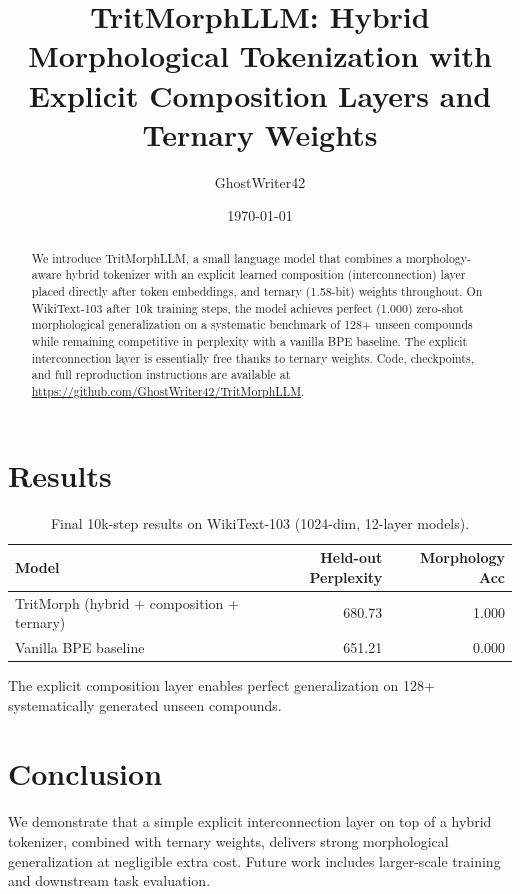 \documentclass[11pt,a4paper]{article}
\title{TritMorphLLM: Hybrid Morphological Tokenization with Explicit Composition Layers and Ternary Weights}
\author{GhostWriter42}
\date{\today}
\begin{document}
\maketitle

\begin{abstract}
We introduce TritMorphLLM, a small language model that combines a morphology-aware hybrid tokenizer with an explicit learned composition (interconnection) layer placed directly after token embeddings, and ternary (1.58-bit) weights throughout. On WikiText-103 after 10k training steps, the model achieves perfect (1.000) zero-shot morphological generalization on a systematic benchmark of 128+ unseen compounds while remaining competitive in perplexity with a vanilla BPE baseline. The explicit interconnection layer is essentially free thanks to ternary weights. Code, checkpoints, and full reproduction instructions are available at \url{https://github.com/GhostWriter42/TritMorphLLM}.
\end{abstract}

\section{Results}

\begin{table}[h]
\centering
\caption{Final 10k-step results on WikiText-103 (1024-dim, 12-layer models).}
\begin{tabular}{lrr}
\toprule
Model & Held-out Perplexity & Morphology Acc \\
\midrule
TritMorph (hybrid + composition + ternary) & 680.73 & 1.000 \\
Vanilla BPE baseline & 651.21 & 0.000 \\
\bottomrule
\end{tabular}
\end{table}

The explicit composition layer enables perfect generalization on 128+ systematically generated unseen compounds.

\section{Conclusion}
We demonstrate that a simple explicit interconnection layer on top of a hybrid tokenizer, combined with ternary weights, delivers strong morphological generalization at negligible extra cost. Future work includes larger-scale training and downstream task evaluation.
\end{document}
